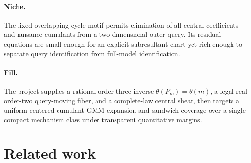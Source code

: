 \documentclass{article}
\begin{document}
\paragraph{Niche.} The fixed overlapping-cycle motif permits elimination of all central coefficients and nuisance cumulants from a two-dimensional outer query. Its residual equations are small enough for an explicit subresultant chart yet rich enough to separate query identification from full-model identification.

\paragraph{Fill.} The project supplies a rational order-three inverse \(\theta(P_m)=\theta(m)\), a legal real order-two query-moving fiber, and a complete-law central shear, then targets a uniform centered-cumulant GMM expansion and sandwich coverage over a single compact mechanism class under transparent quantitative margins.

\section{Related work}
\end{document}
